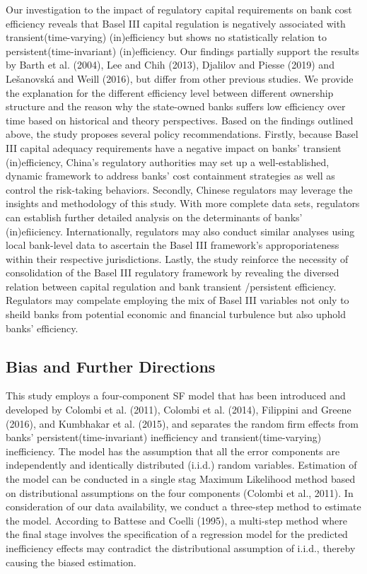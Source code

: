 \documentclass[
  12pt,
  a4paper,
]{scrreprt}
\begin{document}
Our investigation to the impact of regulatory capital requirements on
bank cost efficiency reveals that Basel III capital regulation is
negatively associated with transient(time-varying) (in)efficiency but
shows no statistically relation to persistent(time-invariant)
(in)efficiency. Our findings partially support the results by Barth et
al. (2004), Lee and Chih (2013), Djalilov and Piesse (2019) and
Lešanovská and Weill (2016), but differ from other previous studies. We
provide the explanation for the different efficiency level between
different ownership structure and the reason why the state-owned banks
suffers low efficiency over time based on historical and theory
perspectives. Based on the findings outlined above, the study proposes
several policy recommendations. Firstly, because Basel III capital
adequacy requirements have a negative impact on banks' transient
(in)efficiency, China's regulatory authorities may set up a
well-established, dynamic framework to address banks' cost containment
strategies as well as control the risk-taking behaviors. Secondly,
Chinese regulators may leverage the insights and methodology of this
study. With more complete data sets, regulators can establish further
detailed analysis on the determinants of banks' (in)efiiciency.
Internationally, regulators may also conduct similar analyses using
local bank-level data to ascertain the Basel III framework's
approporiateness within their respective jurisdictions. Lastly, the
study reinforce the necessity of consolidation of the Basel III
regulatory framework by revealing the diversed relation between capital
regulation and bank transient /persistent efficiency. Regulators may
compelate employing the mix of Basel III variables not only to sheild
banks from potential economic and financial turbulence but also uphold
banks' efficiency.

\subsection{Bias and Further
Directions}\label{bias-and-further-directions}

This study employs a four-component SF model that has been introduced
and developed by Colombi et al. (2011), Colombi et al. (2014), Filippini
and Greene (2016), and Kumbhakar et al. (2015), and separates the random
firm effects from banks' persistent(time-invariant) inefficiency and
transient(time-varying) inefficiency. The model has the assumption that
all the error components are independently and identically distributed
(i.i.d.) random variables. Estimation of the model can be conducted in a
single stag Maximum Likelihood method based on distributional
assumptions on the four components (Colombi et al., 2011). In
consideration of our data availability, we conduct a three-step method
to estimate the model. According to Battese and Coelli (1995), a
multi-step method where the final stage involves the specification of a
regression model for the predicted inefficiency effects may contradict
the distributional assumption of i.i.d., thereby causing the biased
estimation.
\end{document}
